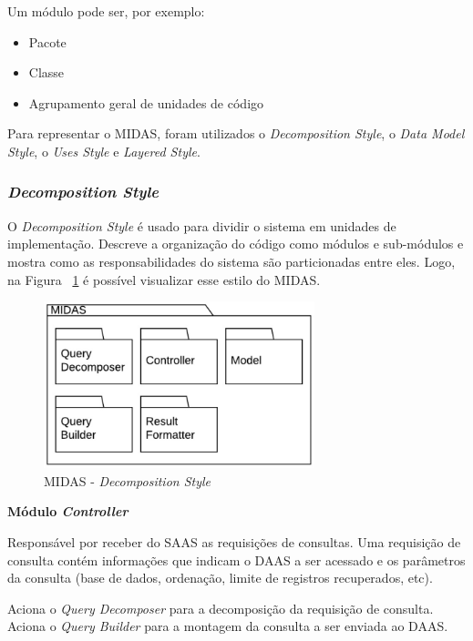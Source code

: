 \documentclass[11pt,a4paper]{article}
\begin{document}
Um módulo pode ser, por exemplo: 

\begin{itemize}
\item Pacote
\item Classe
\item Agrupamento geral de unidades de código
\end{itemize}

Para representar o MIDAS, foram utilizados o \textit{Decomposition Style}, o \textit{Data Model Style}, o \textit{Uses Style} e \textit{Layered Style}. 

\subsubsection{\textit{Decomposition Style}}

O \textit{Decomposition Style} é usado para dividir o sistema em unidades de implementação. Descreve a organização do código como módulos e sub-módulos e mostra como as responsabilidades do sistema são particionadas entre eles. Logo, na Figura ~\ref{decomposicao} é possível visualizar esse estilo do MIDAS.


\begin{figure} [h!]
  \centering
    \includegraphics[width=0.7\textwidth]{MIDAS_-_Estilo_Decomposicao}
  \caption{MIDAS - \textit{Decomposition Style}}
  \label{decomposicao}
\end{figure}

\textbf{Módulo \textit{Controller}}

Responsável por receber do SAAS as requisições de consultas. Uma requisição de consulta contém informações que indicam o DAAS a ser acessado e os parâmetros da consulta (base de dados, ordenação, limite de registros recuperados, etc). 

Aciona o \textit{Query Decomposer} para a decomposição da requisição de consulta. Aciona o \textit{Query Builder} para a montagem da consulta a ser enviada ao DAAS. 
\end{document}

